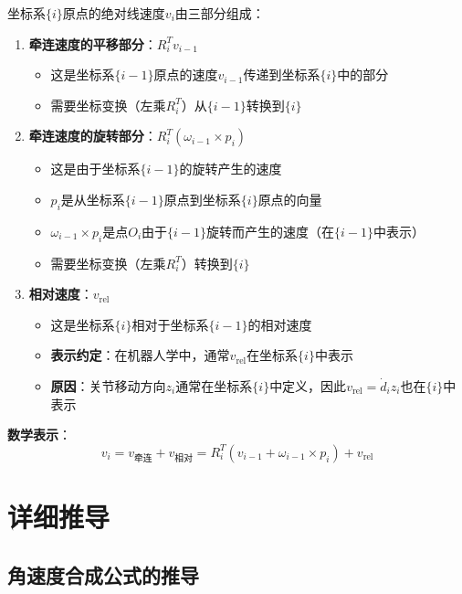 \documentclass[12pt,a4paper]{article}
\begin{document}
坐标系$\{i\}$原点的绝对线速度$v_i$由三部分组成：
\begin{enumerate}
\item \textbf{牵连速度的平移部分}：$R_i^T v_{i-1}$
\begin{itemize}
\item 这是坐标系$\{i-1\}$原点的速度$v_{i-1}$传递到坐标系$\{i\}$中的部分
\item 需要坐标变换（左乘$R_i^T$）从$\{i-1\}$转换到$\{i\}$
\end{itemize}

\item \textbf{牵连速度的旋转部分}：$R_i^T (\omega_{i-1} \times p_i)$
\begin{itemize}
\item 这是由于坐标系$\{i-1\}$的旋转产生的速度
\item $p_i$是从坐标系$\{i-1\}$原点到坐标系$\{i\}$原点的向量
\item $\omega_{i-1} \times p_i$是点$O_i$由于$\{i-1\}$旋转而产生的速度（在$\{i-1\}$中表示）
\item 需要坐标变换（左乘$R_i^T$）转换到$\{i\}$
\end{itemize}

\item \textbf{相对速度}：$v_{\text{rel}}$
\begin{itemize}
\item 这是坐标系$\{i\}$相对于坐标系$\{i-1\}$的相对速度
\item \textbf{表示约定}：在机器人学中，通常$v_{\text{rel}}$在坐标系$\{i\}$中表示
\item \textbf{原因}：关节移动方向$z_i$通常在坐标系$\{i\}$中定义，因此$v_{\text{rel}} = \dot{d}_i z_i$也在$\{i\}$中表示
\end{itemize}
\end{enumerate}

\textbf{数学表示}：
\begin{equation}
v_i = v_{\text{牵连}} + v_{\text{相对}} = R_i^T (v_{i-1} + \omega_{i-1} \times p_i) + v_{\text{rel}}
\end{equation}

\section{详细推导}

\subsection{角速度合成公式的推导}
\end{document}
